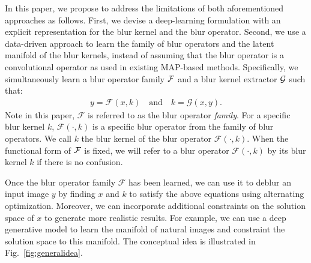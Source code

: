 \documentclass[final]{cvpr}
\newcommand{\Fref}[1]{Fig.~\ref{#1}}
\begin{document}

In this paper, we propose to address the limitations of both aforementioned approaches as follows. First, we devise a deep-learning formulation with an explicit representation for the blur kernel and the blur operator. Second, we use a data-driven approach to learn the family of blur operators and the latent manifold of the blur kernels, instead of assuming that the blur operator is a convolutional operator as used in existing MAP-based methods. Specifically, we simultaneously learn a blur operator family $\mathcal{F}$ and a blur kernel extractor $\mathcal{G}$ such that:
\begin{align}
         y = \mathcal{F}(x, k) \quad \textrm{and} \quad
         k = \mathcal{G}(x, y) \label{eq:ourformula}.
\end{align}
Note in this paper, $\mathcal{F}$ is referred to as the blur operator \textsl{family}. For a specific blur kernel $k$,  $\mathcal{F}(\cdot, k)$ is a specific blur operator from the family of blur operators. We call $k$ the blur kernel of the blur operator $\mathcal{F}(\cdot, k)$. When the functional form of $\mathcal{F}$ is fixed, we will refer to a blur operator $\mathcal{F}(\cdot, k)$ by its blur kernel $k$ if there is no confusion.

Once the blur operator family $\mathcal{F}$ has been learned, we can use it to deblur an input image $y$ by finding $x$ and $k$ to satisfy the above equations using alternating optimization. Moreover, we can incorporate additional constraints on the solution space of $x$ to generate more realistic results. For example, we can use a deep generative model to learn the manifold of natural images and constraint the solution space to this manifold. The conceptual idea is illustrated in \Fref{fig:generalidea}.


\end{document}
